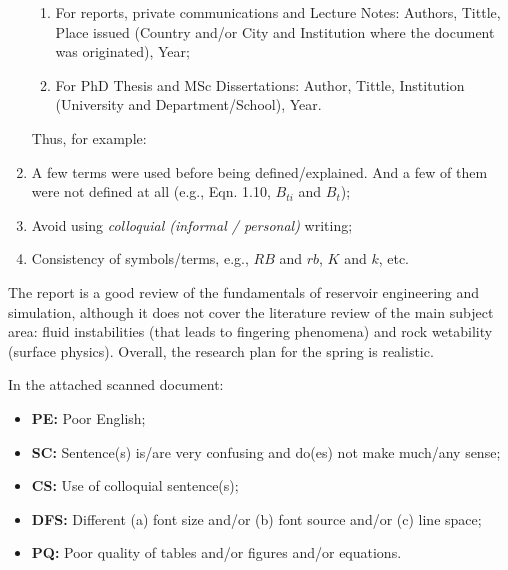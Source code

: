 \documentclass[14pt,twoside]{report}
\begin{document}
\begin{enumerate}
\begin{enumerate}
\item For reports, private communications and Lecture Notes: Authors, Tittle, Place issued (Country and/or City and Institution where the document was originated), Year;
\item For PhD Thesis and MSc Dissertations: Author, Tittle, Institution (University and Department/School), Year.
\end{enumerate}  
Thus, for example:
%
\item A few terms were used before being defined/explained. And a few of them were not defined at all (e.g., Eqn. 1.10, $B_{ti}$ and $B_{t}$); 
%
\item Avoid using {\it colloquial (informal / personal)} writing;
%
\item Consistency of symbols/terms, e.g., $RB$ and $rb$, $K$ and $k$, etc.
% 
\end{enumerate}

The report is a good review of the fundamentals of reservoir engineering and simulation, although it does not cover the literature review of the main subject area: fluid instabilities (that leads to fingering phenomena) and rock wetability (surface physics). Overall, the research plan for the spring is realistic.


In the attached scanned document:
\begin{itemize}
\item {\bf PE:} Poor English;
\item {\bf SC:} Sentence(s) is/are very confusing and do(es) not make much/any sense;
\item {\bf CS:} Use of colloquial sentence(s);
\item {\bf DFS:} Different (a) font size and/or (b) font source and/or (c) line space;
\item {\bf PQ:} Poor quality of tables and/or figures and/or equations. 
\end{itemize}
\medskip
\end{document}
